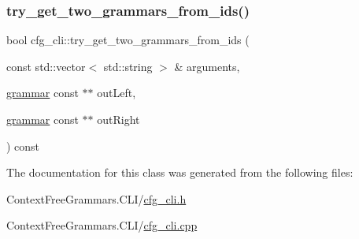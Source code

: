 \mbox{\label{classcfg__cli_aba2c11a19403438eb40392cda3a953f2}} 
\subsubsection{\texorpdfstring{try\_get\_two\_grammars\_from\_ids()}{try\_get\_two\_grammars\_from\_ids()}}
{\footnotesize\ttfamily bool cfg\+\_\+cli\+::try\+\_\+get\+\_\+two\+\_\+grammars\+\_\+from\+\_\+ids (\begin{DoxyParamCaption}\item[{const std\+::vector$<$ std\+::string $>$ \&}]{arguments,  }\item[{\mbox{\hyperlink{classgrammar}{grammar}} const $\ast$$\ast$}]{out\+Left,  }\item[{\mbox{\hyperlink{classgrammar}{grammar}} const $\ast$$\ast$}]{out\+Right }\end{DoxyParamCaption}) const}



The documentation for this class was generated from the following files\+:\begin{DoxyCompactItemize}
\item 
Context\+Free\+Grammars.\+C\+L\+I/\mbox{\hyperlink{cfg__cli_8h}{cfg\+\_\+cli.\+h}}\item 
Context\+Free\+Grammars.\+C\+L\+I/\mbox{\hyperlink{cfg__cli_8cpp}{cfg\+\_\+cli.\+cpp}}\end{DoxyCompactItemize}
